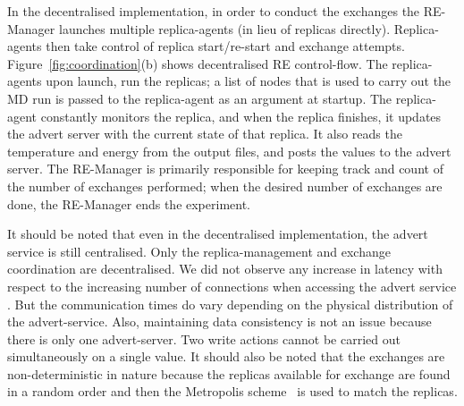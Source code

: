 \documentclass{rspublic}
\newcommand{\jhanote}[1]{ {\textcolor{red} { ***shantenu: #1 }}}
\newcommand{\alnote}[1]{ {\textcolor{blue} { ***andre: #1 }}}
\newcommand{\athotanote}[1]{ {\textcolor{green} { ***athota: #1 }}}
\newcommand{\alnote}[1]{}
\newcommand{\athotanote}[1]{}
\newcommand{\jhanote}[1]{}
\begin{document}
In the decentralised implementation, in order to conduct the exchanges
the RE-Manager launches multiple replica-agents (in lieu of replicas
directly).  Replica-agents then take control of replica start/re-start
and exchange attempts.  Figure~\ref{fig:coordination}(b) shows
decentralised RE control-flow. The replica-agents upon launch, run the
replicas; a list of nodes that is used to carry out the MD run is
passed to the replica-agent as an argument at startup.  The
replica-agent constantly monitors the replica, and when the replica
finishes, it updates the advert server with the current state of that
replica.  It also reads the temperature and energy from the output
files, and posts the values to the advert server.  The RE-Manager is
primarily responsible for keeping track and count of the number of
exchanges performed; when the desired number of exchanges are done,
the RE-Manager ends the experiment.

It should be noted that even in the decentralised implementation, the
advert service is still centralised. Only the replica-management and exchange coordination are decentralised. We did not observe any increase
in latency with respect to the
increasing number of connections when accessing the advert service .  %
But the communication times do vary depending on the physical
distribution of the advert-service. Also, maintaining data consistency is not an issue
because there is only one advert-server.  %
Two write actions cannot be carried out simultaneously on a single value.
It should also be noted that the exchanges are non-deterministic in
nature because the replicas available for exchange are found in a
random order and then the Metropolis scheme~\citep{metropolis:1087} is
used to match the replicas.


\end{document}
